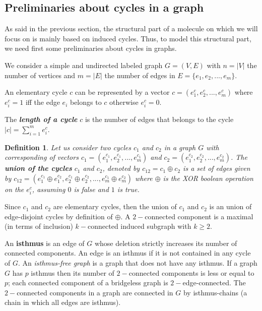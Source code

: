 \documentclass[10pt,letterpaper]{article}
\newtheorem{definition}{Definition}
\begin{document}
\subsection*{Preliminaries about cycles in a graph}

As said in the previous section, the structural part of a molecule on which we will focus on is mainly based on induced cycles. Thus, to model this structural part, we need first some preliminaries about cycles in graphs.

We consider a simple and undirected labeled graph $G=(V,E)$ with $n = |V|$ the number of vertices and $m = |E|$ the number of edges in $E = \{e_1, e_2, ..., e_m\}$.

 An elementary cycle $c$ can be represented by a vector $c = (e_1^c, e_2^c,...,e_m^c)$ where $e_i^c =1$ iff the edge $e_i$ belongs to $c$ otherwise $e_i^c= 0$. 

The\textbf{ \textit{length of a cycle}} $c$ is the number of edges that belongs to the cycle $|c| = \sum\limits_{i=1}^m e_i^c$.

\begin{definition} 
Let us consider two cycles $c_1$ and $c_2$ in a graph $G$ with corresponding of vectors $c_{1}  =(e_{1}^{c_1},e_{2}^{c_1},...,e_{m}^{c_1})$ and $c_2 = (e_1^{c_2},e_2^{c_2},...,e_m^{c_2}) $. The \textbf{union of the cycles} $c_1$ and $c_2$, denoted by $c_{12} = c_1 \oplus c_2$ is a set of edges given by  $c_{12} = (e_1^{c_1} \oplus e_1^{c_2},e_2 ^{c_1}\oplus e_2^{c_2},...,e_m^{c_1}\oplus e_m^{c_2})$ where $\oplus$ is the XOR boolean operation on the $e_i^c$, assuming $0$ is false and $1$ is true.
\end{definition} 

Since  $c_1$ and $c_2$ are elementary cycles, then the union of $c_1$ and $c_2$ is an union of edge-disjoint cycles by definition of $\oplus$. A $2-$connected component is a maximal (in terms of inclusion) $k-$connected induced subgraph with $k \geq 2$. 

An \textbf{isthmus} is an edge of $G$ whose deletion strictly increases its number of connected components. An edge is an isthmus if it is not contained in any cycle of $G$. An \textit{isthmus-free graph} is a graph that does not have any isthmus. If a graph $G$ has $p$ isthmus then its number of $2-$connected components is less or equal to $p$; each connected component of a bridgeless graph is $2-$edge-connected. The $2-$connected components in a graph are connected in $G$ by  isthmus-chains (a chain in which all edges are isthmus).
\end{document}
